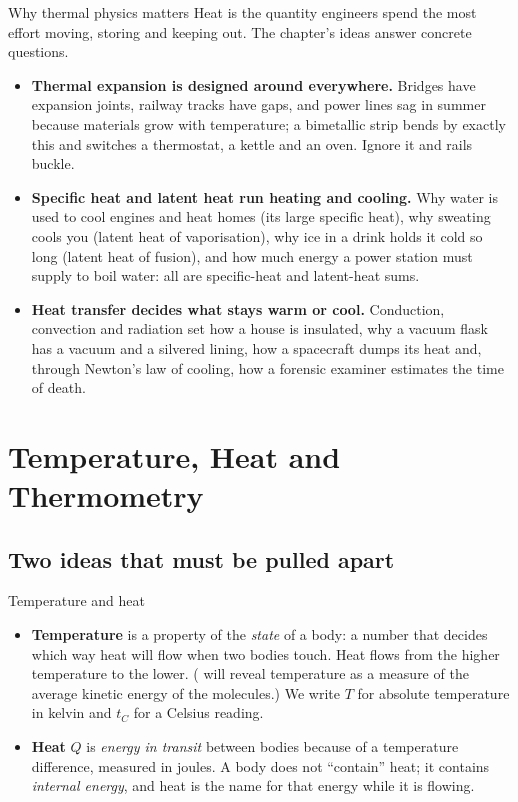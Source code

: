\begin{motivbox}{Why thermal physics matters}
Heat is the quantity engineers spend the most effort moving, storing and keeping out. The chapter's
ideas answer concrete questions.
\begin{itemize}
\item \textbf{Thermal expansion is designed around everywhere.} Bridges have expansion joints, railway
tracks have gaps, and power lines sag in summer because materials grow with temperature; a bimetallic
strip bends by exactly this and switches a thermostat, a kettle and an oven. Ignore it and rails buckle.
\item \textbf{Specific heat and latent heat run heating and cooling.} Why water is used to cool engines
and heat homes (its large specific heat), why sweating cools you (latent heat of vaporisation), why ice
in a drink holds it cold so long (latent heat of fusion), and how much energy a power station must
supply to boil water: all are specific-heat and latent-heat sums.
\item \textbf{Heat transfer decides what stays warm or cool.} Conduction, convection and radiation set
how a house is insulated, why a vacuum flask has a vacuum and a silvered lining, how a spacecraft dumps
its heat and, through Newton's law of cooling, how a forensic examiner estimates the time of death.
\end{itemize}
\end{motivbox}

\section{Temperature, Heat and Thermometry}\label{sec:thermometry}

\subsection{Two ideas that must be pulled apart}

\begin{defbox}{Temperature and heat}
\begin{itemize}
\item \textbf{Temperature} is a property of the \emph{state} of a body: a number that decides which
      way heat will flow when two bodies touch. Heat flows from the higher temperature to the lower.
      ( will reveal temperature as a measure of the average kinetic energy of the
      molecules.) We write $T$ for absolute temperature in kelvin and $t_C$ for a Celsius reading.
\item \textbf{Heat} $Q$ is \emph{energy in transit} between bodies because of a temperature
      difference, measured in joules. A body does not ``contain'' heat; it contains \emph{internal
      energy}, and heat is the name for that energy while it is flowing.
\end{itemize}
\end{defbox}

